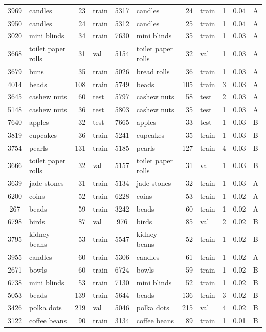 \begin{tabular}{clrlclrlrlc}
3969 & candles & 23 & train & 5317 & candles & 24 & train & 1 & 0.04 & A \\
3950 & candles & 24 & train & 5312 & candles & 25 & train & 1 & 0.04 & A\\
3020 & mini blinds & 34 & train & 7630 & mini blinds & 35 & train & 1 & 0.03 & A\\
3668 & toilet paper rolls & 31 & val & 5154 & toilet paper rolls & 32 & val & 1 & 0.03 & A\\
3679 & buns & 35 & train & 5026 & bread rolls & 36 & train & 1 & 0.03 & A\\
4014 & beads & 108 & train & 5749 & beads & 105 & train & 3 & 0.03 & A\\
3645 & cashew nuts & 60 & test & 5797 & cashew nuts & 58 & test & 2 & 0.03 & A\\
5148 & cashew nuts & 36 & test & 5803 & cashew nuts & 35 & test & 1 & 0.03 & A\\
7640 & apples & 32 & test & 7665 & apples & 33 & test & 1 & 0.03 & B\\
3819 & cupcakes & 36 & train & 5241 & cupcakes & 35 & train & 1 & 0.03 & B\\
3754 & pearls & 131 & train & 5185 & pearls & 127 & train & 4 & 0.03 & B\\
3666 & toilet paper rolls & 32 & val & 5157 & toilet paper rolls & 31 & val & 1 & 0.03 & B\\
3639 & jade stones & 31 & train & 5134 & jade stones & 32 & train & 1 & 0.03 & A\\
6200 & coins & 52 & train & 6228 & coins & 53 & train & 1 & 0.02 & A\\
267 & beads & 59 & train & 3242 & beads & 60 & train & 1 & 0.02 & A\\
6798 & birds & 87 & val & 976 & birds & 85 & val & 2 & 0.02 & B\\
3795 & kidney beans & 53 & train & 5547 & kidney beans & 52 & train & 1 & 0.02 & B\\
3955 & candles & 60 & train & 5306 & candles & 61 & train & 1 & 0.02 & A\\
2671 & bowls & 60 & train & 6724 & bowls & 59 & train & 1 & 0.02 & B\\
6738 & mini blinds & 53 & train & 7130 & mini blinds & 52 & train & 1 & 0.02 & B\\
5053 & beads & 139 & train & 5644 & beads & 136 & train & 3 & 0.02 & B\\
3426 & polka dots & 219 & val & 5046 & polka dots & 215 & val & 4 & 0.02 & B\\
3122 & coffee beans & 90 & train & 3134 & coffee beans & 89 & train & 1 & 0.01 & B\\

\end{tabular}
